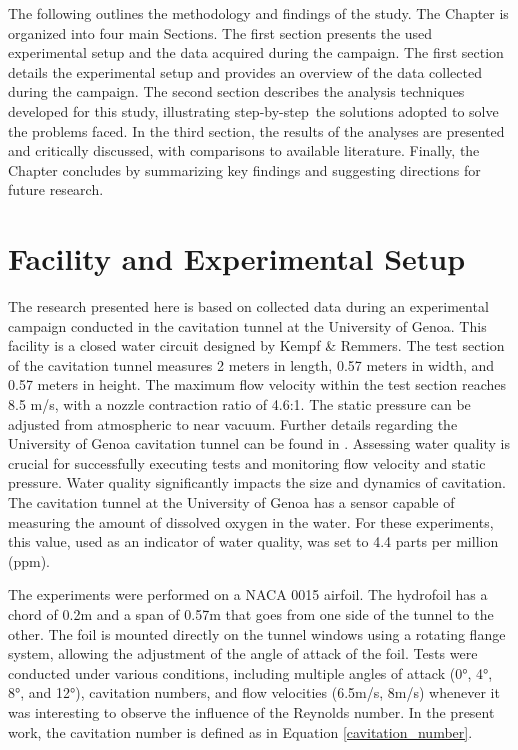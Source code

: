 The following outlines the methodology and findings of the study. The Chapter is organized into four main Sections. The first section presents the used experimental setup and the data acquired during the campaign. The first section details the experimental setup and provides an overview of the data collected during the campaign. The second section describes the analysis techniques developed for this study, illustrating step-by-step the solutions adopted to solve the problems faced. In the third section, the results of the analyses are presented and critically discussed, with comparisons to available literature. Finally, the Chapter concludes by summarizing key findings and suggesting directions for future research.

\section{Facility and Experimental Setup}
\label{sez:setup1}

The research presented here is based on collected data during an experimental campaign conducted in the cavitation tunnel at the University of Genoa. This facility is a closed water circuit designed by Kempf \& Remmers. 
The test section of the cavitation tunnel measures 2 meters in length, 0.57 meters in width, and 0.57 meters in height. The maximum flow velocity within the test section reaches 8.5 m/s, with a nozzle contraction ratio of 4.6:1. The static pressure can be adjusted from atmospheric to near vacuum.
Further details regarding the University of Genoa cavitation tunnel can be found in \cite{Tani2017}.
Assessing water quality is crucial for successfully executing tests and monitoring flow velocity and static pressure. Water quality significantly impacts the size and dynamics of cavitation. The cavitation tunnel at the University of Genoa has a sensor capable of measuring the amount of dissolved oxygen in the water. For these experiments, this value, used as an indicator of water quality, was set to 4.4 parts per million (ppm).

The experiments were performed on a NACA 0015 airfoil. The hydrofoil has a chord of 0.2m and a span of 0.57m that goes from one side of the tunnel to the other. The foil is mounted directly on the tunnel windows using a rotating flange system, allowing the adjustment of the angle of attack of the foil.
Tests were conducted under various conditions, including multiple angles of attack (0°, 4°, 8°, and 12°), cavitation numbers, and flow velocities (6.5m/s, 8m/s) whenever it was interesting to observe the influence of the Reynolds number.
In the present work, the cavitation number is defined as in Equation \ref{cavitation_number}.

